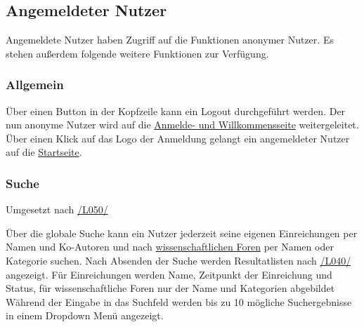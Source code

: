\subsection{Angemeldeter Nutzer}
Angemeldete Nutzer haben Zugriff auf die Funktionen anonymer Nutzer.
Es stehen außerdem folgende weitere Funktionen zur Verfügung.

\subsubsection{Allgemein}
\begin{description}
     Über einen Button in der Kopfzeile kann ein Logout durchgeführt werden.
    Der nun anonyme Nutzer wird auf die \hyperref[an:log]{Anmelde- und Willkommensseite} weitergeleitet.
     Über einen Klick auf das Logo der Anmeldung gelangt ein angemeldeter Nutzer auf die
    \hyperref[nut:start]{Startseite}.
\end{description}

\subsubsection{Suche}
Umgesetzt nach \hyperref[leist:050]{/L050/}
\begin{description}
     Über die globale Suche kann ein Nutzer jederzeit seine eigenen Einreichungen per Namen und Ko-Autoren
    und nach \hyperref[glo:wissForum]{wissenschaftlichen Foren} per Namen oder Kategorie
    suchen. Nach Absenden der Suche werden Resultatlisten nach \hyperref[leist:40]{/L040/} angezeigt.
    Für Einreichungen werden Name, Zeitpunkt der Einreichung und Status, für wissenschaftliche Foren nur der Name und
    Kategorien abgebildet
     Während der Eingabe in das Suchfeld werden bis zu 10 mögliche Suchergebnisse in
    einem Dropdown Menü angezeigt.
\end{description}

